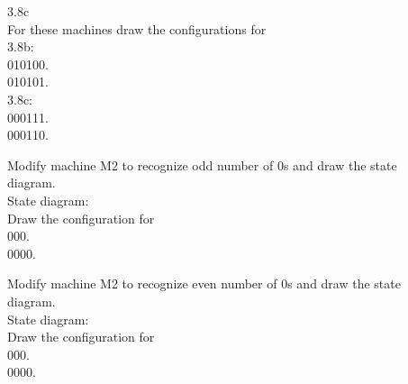 \documentclass[12pt]{article}
\begin{document}
3.8c \\

For these machines draw the configurations for \\
3.8b: \\
010100. \\

010101. \\

3.8c: \\
000111. \\

000110. \\


\pagebreak

Modify machine M2 to recognize odd number of 0s and draw the state \\
diagram. \\

State diagram: \\

Draw the configuration for \\
000. \\

0000. \\

\pagebreak

Modify machine M2 to recognize even number of 0s and draw the state \\
diagram. \\

State diagram: \\

Draw the configuration for \\
000. \\

0000. \\
\end{document}
